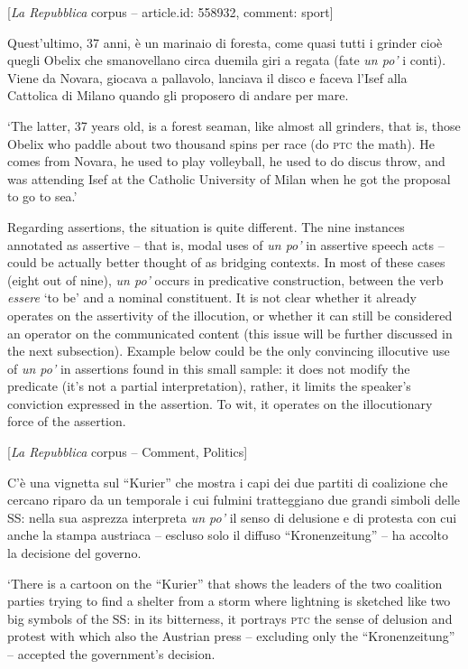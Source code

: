 \ea%
    \label{ex:key:80}

          [\textit{La Repubblica} corpus – article.id: 558932, comment: sport]

Quest’ultimo, 37 anni, è un marinaio di foresta, come quasi tutti i grinder cioè quegli Obelix che smanovellano circa duemila giri a regata (fate \textit{un po’} i conti). Viene da Novara, giocava a pallavolo, lanciava il disco e faceva l’Isef alla Cattolica di Milano quando gli proposero di andare per mare.

\glt ‘The latter, 37 years old, is a forest seaman, like almost all grinders, that is, those Obelix who paddle about two thousand spins per race (do \textsc{ptc} the math). He comes from Novara, he used to play volleyball, he used to do discus throw, and was attending Isef at the Catholic University of Milan when he got the proposal to go to sea.’
    \z %

Regarding assertions, the situation is quite different. The nine instances annotated as assertive – that is, modal uses of \textit{un po’} in assertive speech acts – could be actually better thought of as bridging contexts. In most of these cases (eight out of nine), \textit{un po’} occurs in predicative construction, between the verb \textit{essere} ‘to be’ and a nominal constituent. It is not clear whether it already operates on the assertivity of the illocution, or whether it can still be considered an operator on the communicated content (this issue will be further discussed in the next subsection). Example  below could be the only convincing illocutive use of \textit{un po’} in assertions found in this small sample: it does not modify the predicate (it’s not a partial interpretation), rather, it limits the speaker’s conviction expressed in the assertion. To wit, it operates on the illocutionary force of the assertion.

\ea%
    \label{ex:key:81}

          [\textit{La Repubblica} corpus – Comment, Politics]

C’è una vignetta sul “Kurier” che mostra i capi dei due partiti di coalizione che cercano riparo da un temporale i cui fulmini tratteggiano due grandi simboli delle SS: nella sua asprezza interpreta \textit{un po’} il senso di delusione e di protesta con cui anche la stampa austriaca – escluso solo il diffuso “Kronenzeitung” – ha accolto la decisione del governo.

\glt ‘There is a cartoon on the “Kurier” that shows the leaders of the two coalition parties trying to find a shelter from a storm where lightning is sketched like two big symbols of the SS: in its bitterness, it portrays \textsc{ptc} the sense of delusion and protest with which also the Austrian press – excluding only the “Kronenzeitung” – accepted the government’s decision.
    \z %

